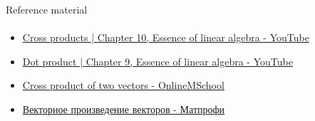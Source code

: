 \documentclass[aspectratio=169,notes]{beamer}
\newcommand{\fbckg}[1]{\usebackgroundtemplate{\texttt{[image: \#1]}}}%
\begin{document}
\begin{frame}[t]{Reference material}
    \framesubtitle{}
    \begin{itemize}
        \item \href{https://youtu.be/eu6i7WJeinw?si=f1X1RMej4nH6WEup}{Cross products | Chapter 10, Essence of linear algebra - YouTube}
        \item \href{https://youtu.be/LyGKycYT2v0?si=AAUk7OolGJPaQT3S}{Dot product | Chapter 9, Essence of linear algebra - YouTube}
        \item \href{https://onlinemschool.com/math/library/vector/multiply1/}{Cross product of two vectors - OnlineMSchool}
        \item \href{http://www.mathprofi.ru/vektornoe_proizvedenie_vektorov_smeshannoe_proizvedenie.html}{Векторное произведение векторов - Матпрофи}
    \end{itemize}
\end{frame}

\fbckg{fibeamer/figs/last_page.png}
\frame[plain]{}
\end{document}
